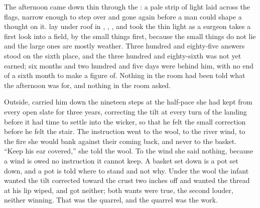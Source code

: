 The afternoon came down thin through the : a pale strip of light laid across the flags, narrow enough to step over and gone again before a man could shape a thought on it.  lay under  roof in , , , and took the thin light as a surgeon takes a first look into a field, by the small things first, because the small things do not lie and the large ones are mostly weather. Three hundred and eighty-five answers stood on the sixth place, and the three hundred and eighty-sixth was not yet earned; six months and two hundred and five days were behind him, with no end of a sixth month to make a figure of. Nothing in the room had been told what the afternoon was for, and nothing in the room asked.

Outside,  carried him down the nineteen steps at the half-pace she had kept from every open slate for three years, correcting the tilt at every turn of the landing before it had time to settle into the wicker, so that he felt the small correction before he felt the stair. The instruction went to the wool, to the river wind, to the fire she would bank against their coming back, and never to the basket. “Keep his ear covered,” she told the wool. To the wind she said nothing, because a wind is owed no instruction it cannot keep. A basket set down is a pot set down, and a pot is told where to stand and not why. Under the wool the infant wanted the tilt corrected toward the crust two inches off and wanted the thread at his lip wiped, and got neither; both wants were true, the second louder, neither winning. That was the quarrel, and the quarrel was the work.


